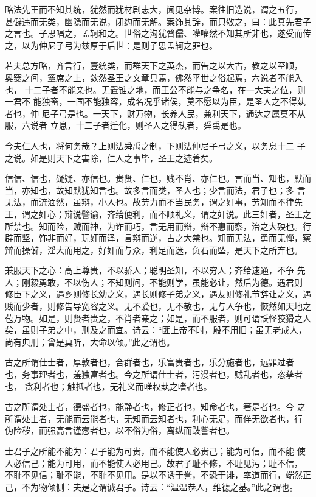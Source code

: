 \documentclass[]{article}
\begin{document}
略法先王而不知其统，犹然而犹材剧志大，闻见杂博。案往旧造说，谓之五行，
甚僻违而无类，幽隐而无说，闭约而无解。案饰其辞，而只敬之，曰：此真先君子
之言也。子思唱之，孟轲和之。世俗之沟犹瞀儒、嚾嚾然不知其所非也，遂受而传
之，以为仲尼子弓为兹厚于后世：是则子思孟轲之罪也。

若夫总方略，齐言行，壹统类，而群天下之英杰，而告之以大古，教之以至顺，
奥窔之间，簟席之上，敛然圣王之文章具焉，佛然平世之俗起焉，六说者不能入也，
十二子者不能亲也。无置锥之地，而王公不能与之争名，在一大夫之位，则一君不
能独畜，一国不能独容，成名况乎诸侯，莫不愿以为臣，是圣人之不得埶者也，仲
尼子弓是也。一天下，财万物，长养人民，兼利天下，通达之属莫不从服，六说者
立息，十二子者迁化，则圣人之得埶者，舜禹是也。

今夫仁人也，将何务哉？上则法舜禹之制，下则法仲尼子弓之义，以务息十二
子之说。如是则天下之害除，仁人之事毕，圣王之迹着矣。

信信、信也，疑疑、亦信也。贵贤、仁也，贱不肖、亦仁也。言而当、知也，默而当，亦知也，故知默犹知言也。故多言而类，圣人也；少言而法，君子也；多
言无法，而流湎然，虽辩，小人也。故劳力而不当民务，谓之奸事，劳知而不律先
王，谓之奸心；辩说譬谕，齐给便利，而不顺礼义，谓之奸说。此三奸者，圣王之
所禁也。知而险，贼而神，为诈而巧，言无用而辩，辩不惠而察，治之大殃也。行
辟而坚，饰非而好，玩奸而泽，言辩而逆，古之大禁也。知而无法，勇而无惮，察
辩而操僻，淫大而用之，好奸而与众，利足而迷，负石而坠，是天下之所弃也。

兼服天下之心：高上尊贵，不以骄人；聪明圣知，不以穷人；齐给速通，不争
先人；刚毅勇敢，不以伤人；不知则问，不能则学，虽能必让，然后为德。遇君则
修臣下之义，遇乡则修长幼之义，遇长则修子弟之义，遇友则修礼节辞让之义，遇
贱而少者，则修告导宽容之义。无不爱也，无不敬也，无与人争也，恢然如天地之
苞万物。如是，则贤者贵之，不肖者亲之；如是，而不服者，则可谓訞怪狡猾之人
矣，虽则子弟之中，刑及之而宜。诗云：``匪上帝不时，殷不用旧；虽无老成人，
尚有典刑；曾是莫听，大命以倾。''此之谓也。

古之所谓仕士者，厚敦者也，合群者也，乐富贵者也，乐分施者也，远罪过者
也，务事理者也，羞独富者也。今之所谓仕士者，污漫者也，贼乱者也，恣孳者也，
贪利者也；触抵者也，无礼义而唯权埶之嗜者也。

古之所谓处士者，德盛者也，能静者也，修正者也，知命者也，箸是者也。今
之所谓处士者，无能而云能者也，无知而云知者也，利心无足，而佯无欲者也，行
伪险秽，而强高言谨悫者也，以不俗为俗，离纵而跂訾者也。

士君子之所能不能为：君子能为可贵，而不能使人必贵己；能为可信，而不能
使人必信己；能为可用，而不能使人必用己。故君子耻不修，不耻见污；耻不信，
不耻不见信；耻不能，不耻不见用。是以不诱于誉，不恐于诽，率道而行，端然正
己，不为物倾侧：夫是之谓诚君子。诗云：``温温恭人，维德之基。''此之谓也。
\end{document}
